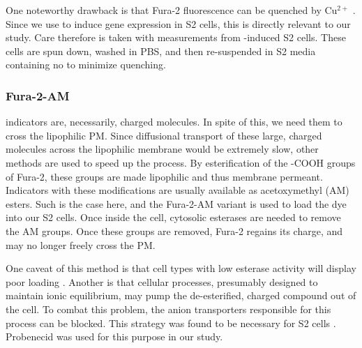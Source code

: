 One noteworthy drawback is that Fura-2 fluorescence can be quenched by Cu$^{2+}$ \citep{WPutney:2006p130, Millar1995}. Since we use \cuso{} to induce gene expression in S2 cells, this is directly relevant to our study. Care therefore is taken with measurements from \cuso-induced S2 cells. These cells are spun down, washed in PBS, and then re-suspended in S2 media containing no \cuso{} to minimize quenching. %

\subsubsection{Fura-2-AM}
\Ca{} indicators are, necessarily, charged molecules. In spite of this, we need them to cross the lipophilic PM. Since diffusional transport of these large, charged molecules across the lipophilic membrane would be extremely slow, other methods are used to speed up the process. By esterification of the -COOH groups of Fura-2, these groups are made lipophilic and thus membrane permeant. Indicators with these modifications are usually available as acetoxymethyl (AM) esters. Such is the case here, and the Fura-2-AM variant is used to load the dye into our S2 cells. 
Once inside the cell, cytosolic esterases are needed to remove the AM groups. Once these groups are removed, Fura-2 regains its charge, and may no longer freely cross the PM. 

One caveat of this method is that cell types with low esterase activity will display poor loading \citep{GLambert:2006p191}.  %
Another is that cellular processes, presumably designed to maintain ionic equilibrium, may pump the de-esterified, charged compound out of the cell. To combat this problem, the anion transporters responsible for this process can be blocked. This strategy was found to be necessary for S2 cells \citep{Cordova2003a, Yagodin1999}. Probenecid was used for this purpose in our study.


